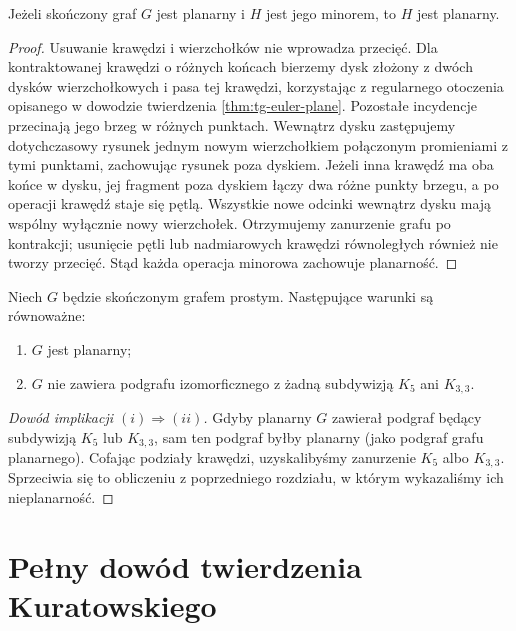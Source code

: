 \begin{stwierdzenie}
Jeżeli skończony graf $G$ jest planarny i $H$ jest jego minorem,
to $H$ jest planarny.
\end{stwierdzenie}

\begin{proof}
Usuwanie krawędzi i wierzchołków nie wprowadza przecięć.
Dla kontraktowanej krawędzi o różnych końcach bierzemy
dysk złożony z dwóch dysków wierzchołkowych i pasa
tej krawędzi, korzystając z regularnego otoczenia
opisanego w dowodzie twierdzenia \ref{thm:tg-euler-plane}.
Pozostałe incydencje przecinają jego brzeg w różnych
punktach. Wewnątrz dysku zastępujemy dotychczasowy
rysunek jednym nowym wierzchołkiem połączonym
promieniami z tymi punktami, zachowując rysunek poza
dyskiem. Jeżeli inna krawędź ma oba końce w dysku, jej
fragment poza dyskiem łączy dwa różne punkty brzegu,
a po operacji krawędź staje się pętlą. Wszystkie
nowe odcinki wewnątrz dysku mają wspólny wyłącznie
nowy wierzchołek. Otrzymujemy zanurzenie grafu po
kontrakcji; usunięcie pętli lub nadmiarowych krawędzi
równoległych również nie tworzy przecięć.
Stąd każda operacja minorowa zachowuje planarność.
\end{proof}

\begin{twierdzenie}[Kuratowski]
\label{thm:tg-kuratowski}
Niech $G$ będzie skończonym grafem prostym. Następujące
warunki są równoważne:
\begin{enumerate}[label=(\roman*)]
\item $G$ jest planarny;
\item $G$ nie zawiera podgrafu izomorficznego z żadną
subdywizją $K_5$ ani $K_{3,3}$.
\end{enumerate}
\end{twierdzenie}

\begin{proof}[Dowód implikacji \texorpdfstring{$(i)\Rightarrow(ii)$}{(i) => (ii)}]
Gdyby planarny $G$ zawierał podgraf będący subdywizją
$K_5$ lub $K_{3,3}$, sam ten podgraf byłby planarny
(jako podgraf grafu planarnego). Cofając podziały krawędzi,
uzyskalibyśmy zanurzenie $K_5$ albo $K_{3,3}$.
Sprzeciwia się to obliczeniu z poprzedniego rozdziału,
w którym wykazaliśmy ich nieplanarność.
\end{proof}

\section{Pełny dowód twierdzenia Kuratowskiego}
\label{sec:tg-kuratowski-full-proof}

